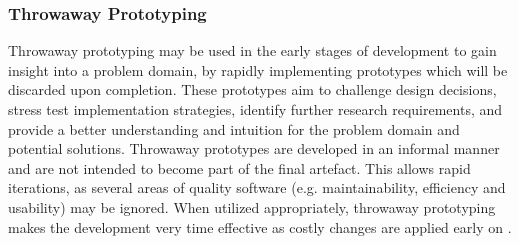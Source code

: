 
\subsubsection{Throwaway Prototyping}
\label{sec:method_throwaway_prototyping}

Throwaway prototyping may be used in the early stages of development to gain insight into a problem domain, by rapidly implementing prototypes which will be discarded upon completion. These prototypes aim to challenge design decisions, stress test implementation strategies, identify further research requirements, and provide a better understanding and intuition for the problem domain and potential solutions. Throwaway prototypes are developed in an informal manner and are not intended to become part of the final artefact. This allows rapid iterations, as several areas of quality software (e.g. maintainability, efficiency and usability) may be ignored. When utilized appropriately, throwaway prototyping makes the development very time effective as costly changes are applied early on \cite{operational_prototyping}.
